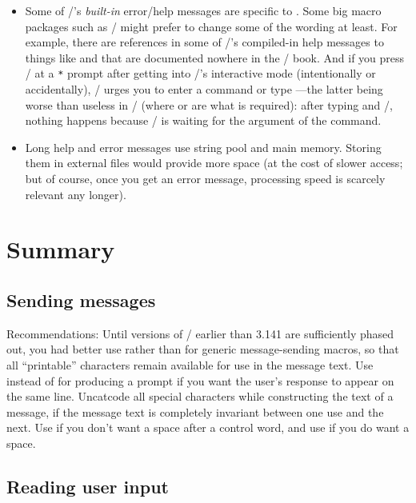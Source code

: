 {\begin{itemize}
\item Some of \tex/'s {\em built-in\/} error/help messages are
specific to . Some big macro packages such as \latex/
might prefer to change some of the wording at least. For example,
there are references in some of \tex/'s compiled-in help messages to
things like  and  that are documented nowhere in
the \latex/ book. And if you press \return/ at a \verb'*' prompt after
getting into \tex/'s interactive mode (intentionally or accidentally),
\tex/ urges you to enter a command or type ---the latter being
worse than useless in \latex/ (where  or
\verb|| are what is required): after typing  and
\return/, nothing happens because \latex/ is waiting for the argument
of the  command.

\item Long help and error messages use string pool and main memory.
Storing them in external files would provide more space (at the cost
of slower access; but of course, once you get an error message,
processing speed is scarcely relevant any longer).

\end{itemize}

\section{Summary}

\subsection{Sending messages}

Recommendations: Until versions of \tex/ earlier than 3.141 are
sufficiently phased out, you had better use 
rather than  for generic message-sending macros, so that
all ``printable'' characters remain available for use in the message
text.  Use  instead of  for
producing a prompt if you want the user's response to appear on the
same line. Uncatcode all special characters while constructing the
text of a message, if the message text is completely invariant between
one use and the next. Use  if you don't want a space after
a control word, and use  if you do want a space.

\subsection{Reading user input}

}
